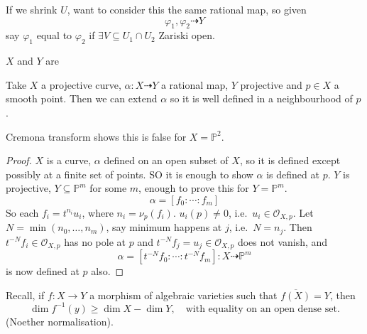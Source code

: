 \documentclass{article}
\newcommand{\proj}{\mathbb{P}}
\begin{document}
If we shrink $U$, want to consider this the same rational map, so given
\begin{equation*}
    \varphi_1, \varphi_2 \dashrightarrow Y
\end{equation*}
say $\varphi_1$ equal to $\varphi_2$ if $\exists V \subseteq U_1 \cap U_2$ Zariski open.
\begin{defi}
    $X$ and $Y$ are
\end{defi}
\begin{prop}
    Take $X$ a projective curve, $\alpha: X \dashrightarrow Y$ a rational map, $Y$ projective and $p \in X$ a smooth point.
    Then we can extend $\alpha$ so it is well defined in a neighbourhood of $p$.
\end{prop}
\begin{remark}
    Cremona transform shows this is false for $X = \proj^2$.
\end{remark}
\begin{proof}
    $X$ is a curve, $\alpha$ defined on an open subset of $X$, so it is defined except possibly at a finite set of points.
    SO it is enough to show $\alpha$ is defined at $p$.
    $Y$ is projective, $Y \subseteq \proj^m$ for some $m$, enough to prove this for $Y = \proj^m$. %
    \begin{equation*}
        \alpha = [f_0 : \dotsb : f_m]
    \end{equation*}
    So each $f_i = t^{n_i} u_i$, where $n_i = \nu_p(f_i)$. $u_i(p) \neq 0$, i.e.\ $u_i \in \mathcal{O}_{X, p}$.
    Let $N = \min(n_0, \dotsc, n_m)$, say minimum happens at $j$, i.e.\ $N = n_j$.
    Then $t^{-N} f_i \in \mathcal{O}_{X, p}$ has no pole at $p$ and $t^{-N} f_j = u_j \in \mathcal{O}_{X, p}$ does not vanish, and
    \begin{equation*}
        \alpha = [t^{-N} f_0: \dotsb : t^{-N} f_m] : X \dashrightarrow \proj^m
    \end{equation*}
    is now defined at $p$ also.
\end{proof}
Recall, if $f: X \to Y$ a morphism of algebraic varieties such that $\overline{f(X)} = Y$, then
\begin{equation*}
    \dim f^{-1}(y) \geq \dim X - \dim Y, \quad \text{with equality on an open dense set.}
\end{equation*}
(Noether normalisation).
\end{document}

